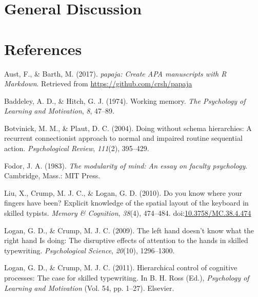 \documentclass[,man,floatsintext]{apa6}
\begin{document}
\hypertarget{general-discussion}{%
\section{General Discussion}\label{general-discussion}}

\newpage

\hypertarget{references}{%
\section{References}\label{references}}

\begingroup
\setlength{\parindent}{-0.5in}
\setlength{\leftskip}{0.5in}

\hypertarget{refs}{}
\leavevmode\hypertarget{ref-R-papaja}{}%
Aust, F., \& Barth, M. (2017). \emph{papaja: Create APA manuscripts with R Markdown}. Retrieved from \url{https://github.com/crsh/papaja}

\leavevmode\hypertarget{ref-BaddeleyWorkingmemory1974}{}%
Baddeley, A. D., \& Hitch, G. J. (1974). Working memory. \emph{The Psychology of Learning and Motivation}, \emph{8}, 47--89.

\leavevmode\hypertarget{ref-BotvinickDoingschemahierarchies2004}{}%
Botvinick, M. M., \& Plaut, D. C. (2004). Doing without schema hierarchies: A recurrent connectionist approach to normal and impaired routine sequential action. \emph{Psychological Review}, \emph{111}(2), 395--429.

\leavevmode\hypertarget{ref-Fodormodularitymindessay1983}{}%
Fodor, J. A. (1983). \emph{The modularity of mind: An essay on faculty psychology}. Cambridge, Mass.: MIT Press.

\leavevmode\hypertarget{ref-Liuyouknowwhere2010}{}%
Liu, X., Crump, M. J. C., \& Logan, G. D. (2010). Do you know where your fingers have been? Explicit knowledge of the spatial layout of the keyboard in skilled typists. \emph{Memory \& Cognition}, \emph{38}(4), 474--484. doi:\href{https://doi.org/10.3758/MC.38.4.474}{10.3758/MC.38.4.474}

\leavevmode\hypertarget{ref-Loganlefthanddoesn2009a}{}%
Logan, G. D., \& Crump, M. J. C. (2009). The left hand doesn't know what the right hand Is doing: The disruptive effects of attention to the hands in skilled typewriting. \emph{Psychological Science}, \emph{20}(10), 1296--1300.

\leavevmode\hypertarget{ref-LoganHierarchicalcontrolcognitive2011}{}%
Logan, G. D., \& Crump, M. J. C. (2011). Hierarchical control of cognitive processes: The case for skilled typewriting. In B. H. Ross (Ed.), \emph{Psychology of Learning and Motivation} (Vol. 54, pp. 1--27). Elsevier.
\end{document}
